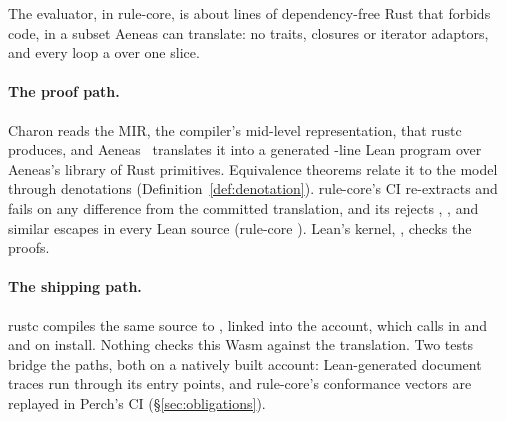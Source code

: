The evaluator,  in rule-core, is about
 lines of dependency-free  Rust that forbids
 code, in a subset Aeneas can translate: no traits, closures or
iterator adaptors, and every loop a  over one slice.

\paragraph{The proof path.} Charon  reads the MIR, the
compiler's mid-level representation, that rustc 
produces, and Aeneas~\cite{aeneas}  translates it into a
generated -line Lean program over Aeneas's library of
Rust primitives. Equivalence theorems relate it to the model through denotations
(Definition~\ref{def:denotation}). rule-core's CI re-extracts and fails on any
difference from the committed translation, and its  rejects
, ,  and similar escapes in every Lean source
(rule-core ). Lean's kernel, ,
checks the proofs.

\paragraph{The shipping path.} rustc  compiles the same source
to , linked into the account, which calls  in
 and  and  on install.
Nothing checks this Wasm against the translation. Two tests bridge the paths,
both on a natively built account:  Lean-generated document
traces run through its entry points, and rule-core's conformance vectors are
replayed in Perch's CI (\S\ref{sec:obligations}).


